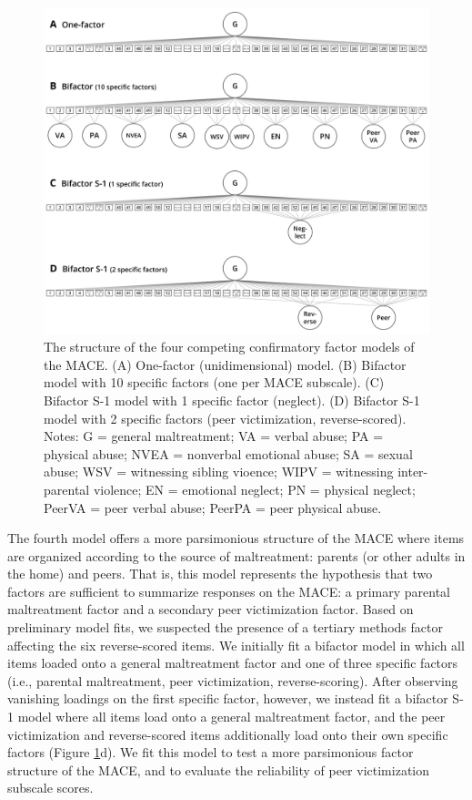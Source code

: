 \documentclass[letterpaper,man,natbib,longtable,floatsintext,12pt]{apa6}
\begin{document}
\begin{figure}[t!]
    \centering
    \includegraphics[width=1.1\textwidth,center]{figures/fig01.png}
    \captionsetup{width=1.1\textwidth}
    \caption{\normalfont The structure of the four competing confirmatory factor models of the MACE. (A) One-factor (unidimensional) model. (B) Bifactor model with 10 specific factors (one per MACE subscale). (C) Bifactor S-1 model with 1 specific factor (neglect). (D) Bifactor S-1 model with 2 specific factors (peer victimization, reverse-scored). Notes: G = general maltreatment; VA = verbal abuse; PA = physical abuse; NVEA = nonverbal emotional abuse; SA = sexual abuse; WSV = witnessing sibling vioence; WIPV = witnessing inter-parental violence; EN = emotional neglect; PN = physical neglect; PeerVA = peer verbal abuse; PeerPA = peer physical abuse.}
    \label{fig:models}
\end{figure}

The fourth model offers a more parsimonious structure of the MACE where items are organized according to the source of maltreatment: parents (or other adults in the home) and peers. That is, this model represents the hypothesis that two factors are sufficient to summarize responses on the MACE: a primary parental maltreatment factor and a secondary peer victimization factor. Based on preliminary model fits, we suspected the presence of a tertiary methods factor affecting the six reverse-scored items. We initially fit a bifactor model in which all items loaded onto a general maltreatment factor and one of three specific factors (i.e., parental maltreatment, peer victimization, reverse-scoring). After observing vanishing loadings on the first specific factor, however, we instead fit a bifactor S-1 model where all items load onto a general maltreatment factor, and the peer victimization and reverse-scored items additionally load onto their own specific factors (Figure \ref{fig:models}d). We fit this model to test a more parsimonious factor structure of the MACE, and to evaluate the reliability of peer victimization subscale scores. 
\end{document}
